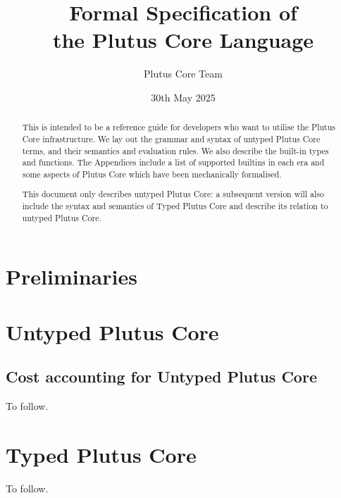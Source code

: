 \documentclass[a4paper]{report}
\title{Formal Specification of\\the Plutus Core Language\\
  \vspace{5mm}
  \LARGE{\red{\textsf{DRAFT}}}
}
\date{30th May 2025}
\author{Plutus Core Team}
\begin{document}
\maketitle

\begin{abstract}
  This is intended to be a reference guide for developers who want to utilise
  the Plutus Core infrastructure.  We lay out the grammar and syntax of untyped
  Plutus Core terms, and their semantics and evaluation rules.  We also describe
  the built-in types and functions.  The Appendices include a list of supported
  builtins in each era and some aspects of Plutus Core which have been
  mechanically formalised.

  This document only describes untyped Plutus Core: a subsequent version will also
  include the syntax and semantics of Typed Plutus Core and describe its relation to
  untyped Plutus Core.
\end{abstract}

\newpage
\tableofcontents
\newpage



\chapter{Preliminaries}


\chapter{Untyped Plutus Core}



\section{Cost accounting for Untyped Plutus Core}
To follow.
\chapter{Typed Plutus Core}
To follow.

\begin{appendices}



\end{appendices}

\newpage


\newpage
\printnomenclature[2cm]  %
\end{document}

